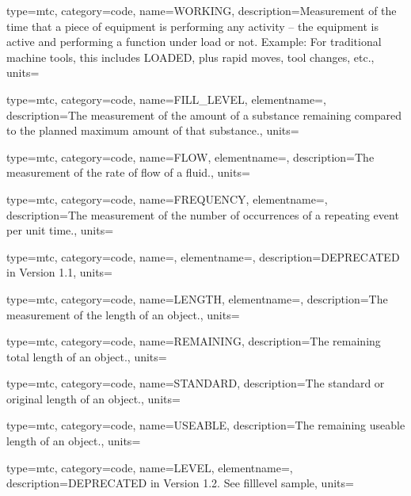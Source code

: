 {
  type=mtc,
  category=code,
  name={WORKING},
  description={Measurement of the time that a piece of equipment is performing any activity – the equipment is active and performing a function under load or not. \newline Example: For traditional machine tools, this includes LOADED, plus rapid moves, tool changes, etc.},
  units=
}

{
  type=mtc,
  category=code,
  name={FILL\_LEVEL},
  elementname=,
  description={The measurement of the amount of a substance remaining compared to the planned maximum amount of that substance.},
  units=
}

{
  type=mtc,
  category=code,
  name={FLOW},
  elementname=,
  description={The measurement of the rate of flow of a fluid.},
  units=
}

{
  type=mtc,
  category=code,
  name={FREQUENCY},
  elementname=,
  description={The measurement of the number of occurrences of a repeating event per unit time.},
  units=
}

{
  type=mtc,
  category=code,
  name=,
  elementname=,
  description={DEPRECATED in Version 1.1},
  units={}
}

{
  type=mtc,
  category=code,
  name={LENGTH},
  elementname=,
  description={The measurement of the length of an object.},
  units=
}

{
  type=mtc,
  category=code,
  name={REMAINING},
  description={The remaining total length of an object.},
  units=
}

{
  type=mtc,
  category=code,
  name={STANDARD},
  description={The standard or original length of an object.},
  units=
}

{
  type=mtc,
  category=code,
  name={USEABLE},
  description={The remaining useable length of an object.},
  units=
}

{
  type=mtc,
  category=code,
  name={LEVEL},
  elementname=,
  description={DEPRECATED in Version 1.2.  See \gls{filllevel sample}},
  units={}
}

